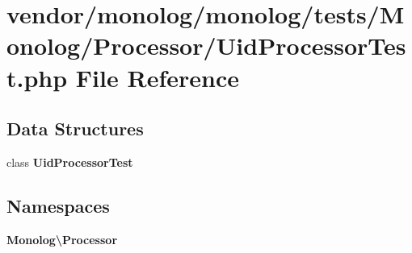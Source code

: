\section{vendor/monolog/monolog/tests/\+Monolog/\+Processor/\+Uid\+Processor\+Test.php File Reference}
\label{_uid_processor_test_8php}
\subsection*{Data Structures}
\begin{DoxyCompactItemize}
\item 
class {\bf Uid\+Processor\+Test}
\end{DoxyCompactItemize}
\subsection*{Namespaces}
\begin{DoxyCompactItemize}
\item 
 {\bf Monolog\textbackslash{}\+Processor}
\end{DoxyCompactItemize}
